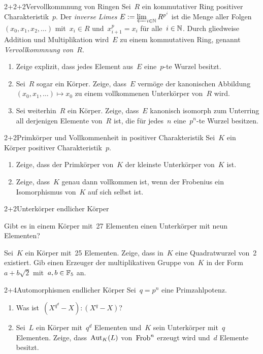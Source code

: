 \documentclass{algblatt}
\begin{document}

\begin{aufgabe}{2+2+2}{Vervollkommnung von Ringen}
Sei~$R$ ein kommutativer Ring positiver Charakteristik~$p$. Der \emph{inverse
Limes} $E := \varprojlim_{i \in \mathbb{N}} R^{p^i}$ ist die Menge aller
Folgen~$(x_0,x_1,x_2,\ldots)$ mit~$x_i \in R$ und~$x_{i+1}^p = x_i$ für alle~$i
\in \mathbb{N}$. Durch gliedweise Addition und Multiplikation wird~$E$ zu einem
kommutativen Ring, genannt \emph{Vervollkommnung von~$R$}.
\begin{enumerate}
\item Zeige explizit, dass jedes Element aus~$E$ eine~$p$-te Wurzel besitzt.
\item Sei~$R$ sogar ein Körper. Zeige, dass~$E$ vermöge der kanonischen
Abbildung~$(x_0,x_1,\ldots) \mapsto x_0$ zu einem vollkommenen Unterkörper
von~$R$ wird.
\item Sei weiterhin~$R$ ein Körper. Zeige, dass~$E$ kanonisch isomorph zum
Unterring all derjenigen Elemente von~$R$ ist, die für jedes~$n$ eine~$p^n$-te Wurzel
besitzen.
\end{enumerate}
\end{aufgabe}

\begin{aufgabe}{2+2}{Primkörper und Vollkommenheit in positiver Charakteristik}
Sei~$K$ ein Körper positiver Charakteristik~$p$.
\begin{enumerate}
\item Zeige, dass der Primkörper von~$K$
der kleinste Unterkörper von~$K$ ist.
\item Zeige, dass~$K$ genau dann
vollkommen ist, wenn der Frobenius ein Isomorphismus von~$K$ auf sich selbst
ist.
\end{enumerate}
\end{aufgabe}

\begin{aufgabeE}{2+2}{Unterkörper endlicher Körper}
\item Gibt es in einem Körper mit~27 Elementen einen Unterkörper mit neun
Elementen?
\item Sei~$K$ ein Körper mit~25 Elementen. Zeige, dass in~$K$ eine
Quadratwurzel von~2 existiert. Gib einen Erzeuger der multiplikativen Gruppe
von~$K$ in der Form~$a + b \sqrt{2}$ mit~$a,b \in \mathbb{F}_5$ an.
\end{aufgabeE}

\begin{aufgabe}{2+4}{Automorphismen endlicher Körper}
Sei~$q = p^n$ eine Primzahlpotenz.
\begin{enumerate}
\item Was ist~$(X^{q^d} - X) : (X^q - X)$?
\item Sei~$L$ ein Körper mit~$q^d$ Elementen und~$K$ sein Unterkörper mit~$q$
Elementen. Zeige, dass~$\mathrm{Aut}_K(L)$ von~$\mathrm{Frob}^n$ erzeugt wird und~$d$ Elemente
besitzt.
\end{enumerate}
\end{aufgabe}
\end{document}
